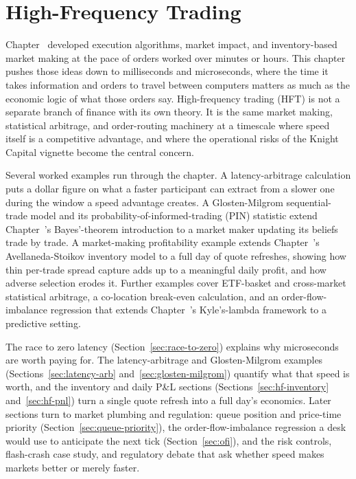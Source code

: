 \documentclass[../ai_in_finance]{subfiles}
\begin{document}
\chapter{High-Frequency Trading}

Chapter~ developed execution algorithms, market impact, and inventory-based market making at the pace of orders worked over minutes or hours. This chapter pushes those ideas down to milliseconds and microseconds, where the time it takes information and orders to travel between computers matters as much as the economic logic of what those orders say. High-frequency trading (HFT) is not a separate branch of finance with its own theory. It is the same market making, statistical arbitrage, and order-routing machinery at a timescale where speed itself is a competitive advantage, and where the operational risks of the Knight Capital vignette become the central concern.

Several worked examples run through the chapter. A latency-arbitrage calculation puts a dollar figure on what a faster participant can extract from a slower one during the window a speed advantage creates. A Glosten-Milgrom sequential-trade model and its probability-of-informed-trading (PIN) statistic extend Chapter~'s Bayes'-theorem introduction to a market maker updating its beliefs trade by trade. A market-making profitability example extends Chapter~'s Avellaneda-Stoikov inventory model to a full day of quote refreshes, showing how thin per-trade spread capture adds up to a meaningful daily profit, and how adverse selection erodes it. Further examples cover ETF-basket and cross-market statistical arbitrage, a co-location break-even calculation, and an order-flow-imbalance regression that extends Chapter~'s Kyle's-lambda framework to a predictive setting.

The race to zero latency (Section~\ref{sec:race-to-zero}) explains why microseconds are worth paying for. The latency-arbitrage and Glosten-Milgrom examples (Sections~\ref{sec:latency-arb} and~\ref{sec:glosten-milgrom}) quantify what that speed is worth, and the inventory and daily P\&L sections (Sections~\ref{sec:hf-inventory} and~\ref{sec:hf-pnl}) turn a single quote refresh into a full day's economics. Later sections turn to market plumbing and regulation: queue position and price-time priority (Section~\ref{sec:queue-priority}), the order-flow-imbalance regression a desk would use to anticipate the next tick (Section~\ref{sec:ofi}), and the risk controls, flash-crash case study, and regulatory debate that ask whether speed makes markets better or merely faster.
\end{document}
